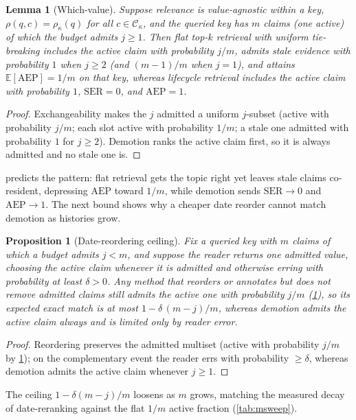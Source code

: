 \documentclass[letterpaper]{article}
\theoremstyle{plain}
\newtheorem{proposition}{Proposition}
\newtheorem{lemma}{Lemma}
\begin{document}
\begin{lemma}[Which-value]
\label{lem:whichvalue}
Suppose relevance is value-agnostic within a key, $\rho(q,c)=\rho_\kappa(q)$ for all $c\in\mathcal{C}_\kappa$, and the queried key has $m$ claims (one active) of which the budget admits $j\geq 1$. Then flat top-$k$ retrieval with uniform tie-breaking includes the active claim with probability $j/m$, admits stale evidence with probability $1$ when $j\geq 2$ (and $(m-1)/m$ when $j=1$), and attains $\mathbb{E}[\mathrm{AEP}]=1/m$ on that key, whereas lifecycle retrieval includes the active claim with probability $1$, $\mathrm{SER}=0$, and $\mathrm{AEP}=1$.
\end{lemma}
\begin{proof}
Exchangeability makes the $j$ admitted a uniform $j$-subset (active with probability $j/m$; each slot active with probability $1/m$; a stale one admitted with probability $1$ for $j\geq2$). Demotion ranks the active claim first, so it is always admitted and no stale one is.
\end{proof}

 predicts the pattern: flat retrieval gets the topic right yet leaves stale claims co-resident, depressing $\mathrm{AEP}$ toward $1/m$, while demotion sends $\mathrm{SER}\to0$ and $\mathrm{AEP}\to1$. The next bound shows why a cheaper date reorder cannot match demotion as histories grow.

\begin{proposition}[Date-reordering ceiling]
\label{prop:datererank}
Fix a queried key with $m$ claims of which a budget admits $j<m$, and suppose the reader returns one admitted value, choosing the active claim whenever it is admitted and otherwise erring with probability at least $\delta>0$. Any method that reorders or annotates but does not remove admitted claims still admits the active one with probability $j/m$ (\cref{lem:whichvalue}), so its expected exact match is at most $1-\delta\,(m-j)/m$, whereas demotion admits the active claim always and is limited only by reader error.
\end{proposition}
\begin{proof}
Reordering preserves the admitted multiset (active with probability $j/m$ by \cref{lem:whichvalue}); on the complementary event the reader errs with probability $\geq\delta$, whereas demotion admits the active claim whenever $j\geq1$.
\end{proof}

The ceiling $1-\delta(m-j)/m$ loosens as $m$ grows, matching the measured decay of date-reranking against the flat $1/m$ active fraction (\cref{tab:msweep}).
\end{document}
